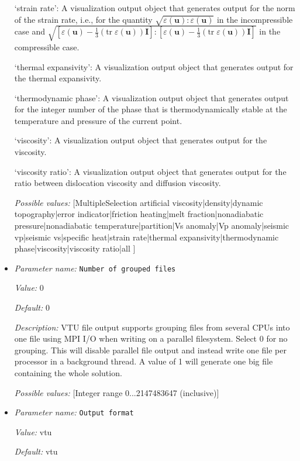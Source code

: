 \begin{itemize}
`strain rate': A visualization output object that generates output for the norm of the strain rate, i.e., for the quantity $\sqrt{\varepsilon(\mathbf u):\varepsilon(\mathbf u)}$ in the incompressible case and $\sqrt{[\varepsilon(\mathbf u)-\tfrac 13(\textrm{tr}\;\varepsilon(\mathbf u))\mathbf I]:[\varepsilon(\mathbf u)-\tfrac 13(\textrm{tr}\;\varepsilon(\mathbf u))\mathbf I]}$ in the compressible case.

`thermal expansivity': A visualization output object that generates output for the thermal expansivity.

`thermodynamic phase': A visualization output object that generates output for the integer number of the phase that is thermodynamically stable at the temperature and pressure of the current point.

`viscosity': A visualization output object that generates output for the viscosity.

`viscosity ratio': A visualization output object that generates output for the ratio between dislocation viscosity and diffusion viscosity.


{\it Possible values:} [MultipleSelection artificial viscosity|density|dynamic topography|error indicator|friction heating|melt fraction|nonadiabatic pressure|nonadiabatic temperature|partition|Vs anomaly|Vp anomaly|seismic vp|seismic vs|specific heat|strain rate|thermal expansivity|thermodynamic phase|viscosity|viscosity ratio|all ]
\item {\it Parameter name:} {\tt Number of grouped files}


{\it Value:} 0


{\it Default:} 0


{\it Description:} VTU file output supports grouping files from several CPUs into one file using MPI I/O when writing on a parallel filesystem. Select 0 for no grouping. This will disable parallel file output and instead write one file per processor in a background thread. A value of 1 will generate one big file containing the whole solution.


{\it Possible values:} [Integer range 0...2147483647 (inclusive)]
\item {\it Parameter name:} {\tt Output format}


{\it Value:} vtu


{\it Default:} vtu



\end{itemize}
